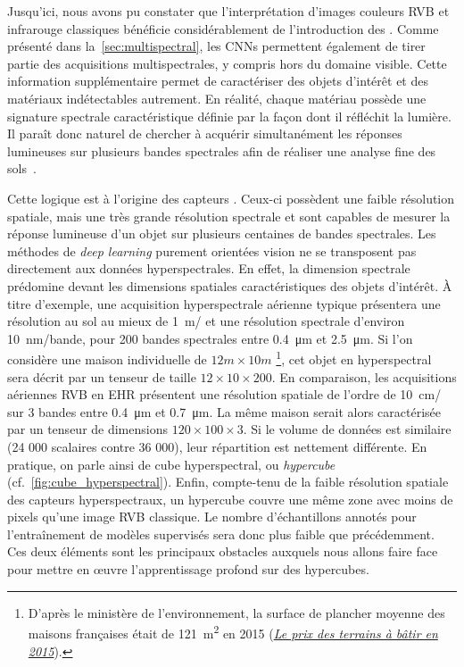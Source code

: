 Jusqu'ici, nous avons pu constater que l'interprétation d'images couleurs \gls{RVB} et infrarouge classiques bénéficie considérablement de l'introduction des . Comme présenté dans la~\cref{sec:multispectral}, les \glspl{CNN} permettent également de tirer partie des acquisitions multispectrales, y compris hors du domaine visible. Cette information supplémentaire permet de caractériser des objets d'intérêt et des matériaux indétectables autrement. En réalité, chaque matériau possède une signature spectrale caractéristique définie par la façon dont il réfléchit la lumière. Il paraît donc naturel de chercher à acquérir simultanément les réponses lumineuses sur plusieurs bandes spectrales afin de réaliser une analyse fine des sols~\cite{cubero-castan_physics-based_2015,fabre_estimation_2015}.

Cette logique est à l'origine des capteurs . Ceux-ci possèdent une faible résolution spatiale, mais une très grande résolution spectrale et sont capables de mesurer la réponse lumineuse d'un objet sur plusieurs centaines de bandes spectrales. Les méthodes de \emph{deep learning} purement orientées vision ne se transposent pas directement aux données hyperspectrales. En effet, la dimension spectrale prédomine devant les dimensions spatiales caractéristiques des objets d'intérêt. À titre d'exemple, une acquisition hyperspectrale aérienne typique présentera une résolution au sol au mieux de \SI{1}{\meter/\px} et une résolution spectrale d'environ \SI{10}{\nano\meter/bande}, pour 200 bandes spectrales entre \SI{0,4}{\micro\meter} et \SI{2,5}{\micro\meter}. Si l'on considère une maison individuelle de $12m\times10m$ \footnote{D'après le ministère de l'environnement, la surface de plancher moyenne des maisons françaises était de \SI{121}{\meter\squared} en 2015 (\href{http://www.cohesion-territoires.gouv.fr/IMG/pdf/datalab-essentiel-51-le-prix-des-terrains-a-batir-en-2015-oct2016.pdf}{\og \emph{Le prix des terrains à bâtir en 2015\fg}}).}, cet objet en hyperspectral sera décrit par un tenseur de taille $12\times10\times200$.
En comparaison, les acquisitions aériennes \gls{RVB} en \gls{EHR} présentent une résolution spatiale de l'ordre de \SI{10}{\centi\meter/\px} sur 3 bandes entre \SI{0,4}{\micro\meter} et \SI{0,7}{\micro\meter}. La même maison serait alors caractérisée par un tenseur de dimensions $120\times100\times3$. Si le volume de données est similaire (24 000 scalaires contre 36 000), leur répartition est nettement différente. En pratique, on parle ainsi de cube hyperspectral, ou \emph{hypercube} (cf.~\cref{fig:cube_hyperspectral}). Enfin, compte-tenu de la faible résolution spatiale des capteurs hyperspectraux, un hypercube couvre une même zone avec moins de pixels qu'une image \gls{RVB} classique. Le nombre d'échantillons annotés pour l'entraînement de modèles supervisés sera donc plus faible que précédemment. Ces deux éléments sont les principaux obstacles auxquels nous allons faire face pour mettre en \oe{}uvre l'apprentissage profond sur des hypercubes.

